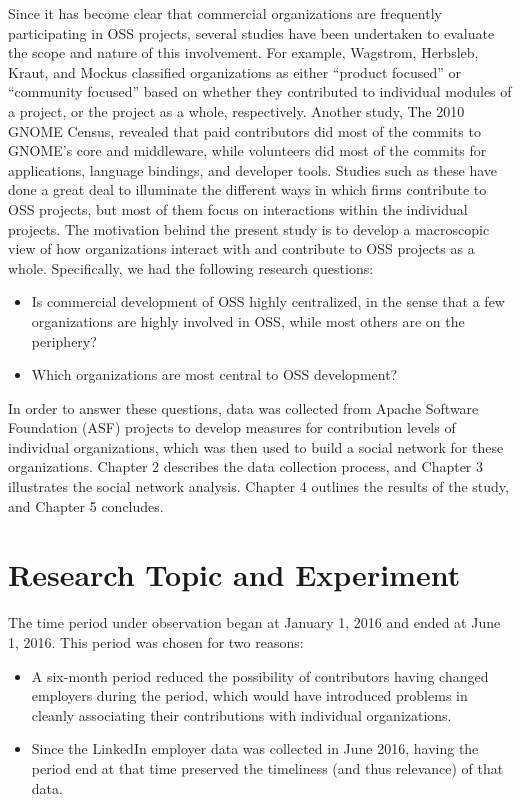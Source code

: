 Since it has become clear that commercial organizations are frequently participating in OSS projects, several studies have been undertaken to evaluate the scope and nature of this involvement. For example, Wagstrom, Herbsleb, Kraut, and Mockus \cite{wagstrom2010impact} classified organizations as either ``product focused'' or ``community focused'' based on whether they contributed to individual modules of a project, or the project as a whole, respectively. Another study, The 2010 GNOME Census\cite{neary2010gnome}, revealed that paid contributors did most of the commits to GNOME's core and middleware, while volunteers did most of the commits for applications, language bindings, and developer tools. Studies such as these have done a great deal to illuminate the different ways in which firms contribute to OSS projects, but most of them focus on interactions within the individual projects. The motivation behind the present study is to develop a macroscopic view of how organizations interact with and contribute to OSS projects as a whole. Specifically, we had the following research questions:
\begin{itemize}
	\item Is commercial development of OSS highly centralized, in the sense that a few organizations are highly involved in OSS, while most others are on the periphery?
	\item Which organizations are most central to OSS development?
\end{itemize}
In order to answer these questions, data was collected from Apache Software Foundation (ASF) projects to develop measures for contribution levels of individual organizations, which was then used to build a social network for these organizations. Chapter 2 describes the data collection process, and Chapter 3 illustrates the social network analysis. Chapter 4 outlines the results of the study, and Chapter 5 concludes.

\section{Research Topic and Experiment}
The time period \timeperiod{} under observation began at January 1, 2016 and ended at June 1, 2016. This period was chosen for two reasons:
\begin{itemize}
	\item A six-month period reduced the possibility of contributors having changed employers during the period, which would have introduced problems in cleanly associating their contributions with individual organizations.
	\item Since the LinkedIn employer data was collected in June 2016, having the period end at that time preserved the timeliness (and thus relevance) of that data.
\end{itemize}
